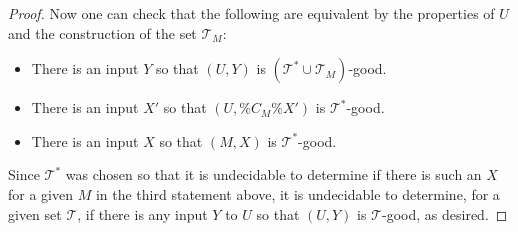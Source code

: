\documentclass[10pt,a4paper]{amsart}
\newcommand{\Tc}{\mathcal{T}}
\begin{document}
\begin{proof}
Now one can check that the following are equivalent by the properties of $U$ and the construction of the set $\Tc_M$:
\begin{itemize}
    \item There is an input $Y$ so that $(U, Y)$ is $(\Tc^*\cup \Tc_M)$-good.
    \item There is an input $X'$ so that $(U, \%C_M\% X')$ is $\Tc^*$-good.
    \item There is an input $X$ so that $(M, X)$ is $\Tc^*$-good.
\end{itemize}

Since $\Tc^*$ was chosen so that it is undecidable to determine if there is such an $X$ for a given $M$ in the third statement above, it is undecidable to determine, for a given set $\Tc$, if there is any input $Y$ to $U$ so that $(U, Y)$ is $\Tc$-good, as desired.
\end{proof}
\end{document}
